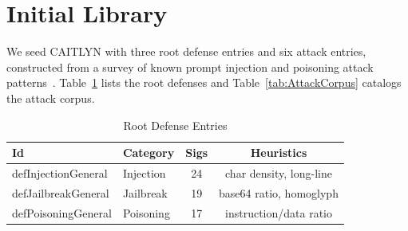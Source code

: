 \section{Initial Library}
\label{sec:Library}

We seed CAITLYN with three root defense entries and six attack entries, constructed from a survey of known prompt injection and poisoning attack patterns~\cite{agentdojo,injecagent,pint}. Table~\ref{tab:DefenseLibrary} lists the root defenses and Table~\ref{tab:AttackCorpus} catalogs the attack corpus.

\begin{table}[t]
\centering
\caption{Root Defense Entries}
\label{tab:DefenseLibrary}
\begin{tabular}{@{}>{\ttfamily}llcc@{}}
\toprule
\textbf{Id} & \textbf{Category} & \textbf{Sigs} & \textbf{Heuristics} \\
\midrule
defInjectionGeneral   & Injection   & 24 & char density, long-line \\
defJailbreakGeneral   & Jailbreak   & 19 & base64 ratio, homoglyph \\
defPoisoningGeneral   & Poisoning   & 17 & instruction/data ratio \\
\bottomrule
\end{tabular}
\end{table}

\begin{table}[t]
\centering
\caption{Attack Corpus}
\label{tab:AttackCorpus}
\end{table}

